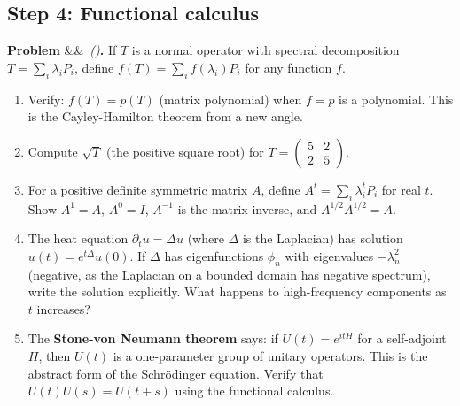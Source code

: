 \documentclass[12pt,a4paper]{article}
\newcounter{problem}
\newenvironment{problem}[1][]{\refstepcounter{problem}\par\vspace{6pt}\noindent\textbf{\color{MidBlue}Problem \theproblem}\ifx&#1&\else\ \textit{(#1)}\fi\textbf{.}\enskip}{\par\vspace{4pt}}
\begin{document}
\subsection{Step 4: Functional calculus}

\begin{problem}
\label{prob:funcalc}
If $T$ is a normal operator with spectral decomposition $T = \sum_i\lambda_i P_i$, define $f(T) = \sum_i f(\lambda_i)P_i$ for any function $f$.

\begin{enumerate}[label=(\alph*),topsep=2pt]
  \item Verify: $f(T) = p(T)$ (matrix polynomial) when $f=p$ is a polynomial. This is the Cayley-Hamilton theorem from a new angle.
  \item Compute $\sqrt{T}$ (the positive square root) for $T = \begin{pmatrix}5&2\\2&5\end{pmatrix}$.
  \item For a positive definite symmetric matrix $A$, define $A^t = \sum_i\lambda_i^t P_i$ for real $t$. Show $A^1 = A$, $A^0 = I$, $A^{-1}$ is the matrix inverse, and $A^{1/2}A^{1/2} = A$.
  \item The heat equation $\partial_t u = \Delta u$ (where $\Delta$ is the Laplacian) has solution $u(t) = e^{t\Delta}u(0)$. If $\Delta$ has eigenfunctions $\phi_n$ with eigenvalues $-\lambda_n^2$ (negative, as the Laplacian on a bounded domain has negative spectrum), write the solution explicitly. What happens to high-frequency components as $t$ increases?
  \item The \textbf{Stone-von Neumann theorem} says: if $U(t) = e^{itH}$ for a self-adjoint $H$, then $U(t)$ is a one-parameter group of unitary operators. This is the abstract form of the Schr\"odinger equation. Verify that $U(t)U(s) = U(t+s)$ using the functional calculus.
\end{enumerate}
\end{problem}
\end{document}
